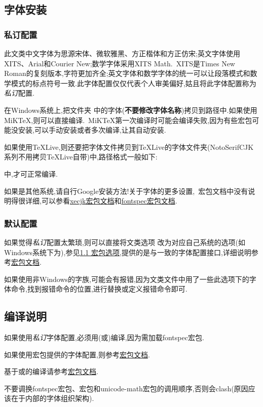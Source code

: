 \documentclass[list,answers,csize4,custom]{sysuexam}
\begin{document}
\subsection{字体安装}
\subsubsection{私订配置}
此文类中文字体为思源宋体、微软雅黑、方正楷体和方正仿宋;英文字体使用XITS、Arial和Courier New;数学字体采用XITS Math.~XITS是Times New Roman的复刻版本,字符更加齐全;英文字体和数学字体的统一可以让段落模式和数学模式的标点符号一致.此字体配置仅仅代表个人审美偏好,姑且将此字体配置称为\textit{私订}配置.

在Windows系统上,把文件夹  中的字体(\textbf{不要修改字体名称})拷贝到路径中.如果使用MiK\TeX{},则可以直接编译.~MiK\TeX{}第一次编译时可能会编译失败,因为有些宏包可能没安装,可以手动安装或者多次编译,让其自动安装.

如果使用\TeX{}Live,则还要把字体文件拷贝到\TeX{}Live的字体文件夹(NotoSerifCJK系列不用拷贝\TeX{}Live自带)中,路径格式一般如下:\par
{}\par
\noindent 中,才可正常编译.

如果是其他系统,请自行Google安装方法!关于字体的更多设置,~\CTeX{}宏包文档中没有说明得很详细,可以参看\href{http://mirrors.ctan.org/macros/xetex/latex/xecjk/xeCJK.pdf}{xecjk宏包文档}和\href{http://mirrors.ctan.org/macros/unicodetex/latex/fontspec/fontspec.pdf}{fontspec宏包文档}.

\subsubsection{默认配置}
如果觉得\textit{私订}配置太繁琐,则可以直接将文类选项  改为对应自己系统的选项(如Windows系统下为),参见\hyperlink{hbxx}{1.1 宏包选项},提供的是与\CTeX{}一致的字体配置接口,详细说明参考\href{http://mirrors.ctan.org/language/chinese/ctex/ctex.pdf}{\CTeX{}宏包文档}.

如果使用非Windows的字族,可能会有报错,因为文类文件中用了一些此选项下的字体命令,找到报错命令的位置,进行替换或定义报错命令即可.

\subsection{编译说明}
\begin{compactitem}
    \item 如果使用\textit{私订}字体配置,必须用(或)编译,因为需加载fontspec宏包.
    \item 如果使用\CTeX{}宏包提供的字体配置,则参考\href{http://mirrors.ctan.org/language/chinese/ctex/ctex.pdf}{\CTeX{}宏包文档}.
    \item 基于或的编译请参考\href{http://mirrors.ctan.org/language/chinese/ctex/ctex.pdf}{\CTeX{}宏包文档}.
    \item 不要调换fontspec宏包、\CTeX{}宏包和unicode-math宏包的调用顺序,否则会clash(原因应该在于内部的字体组织架构).
\end{compactitem}
\end{document}
